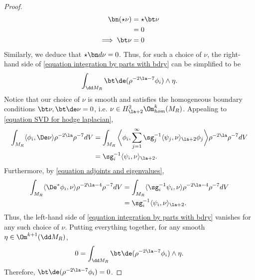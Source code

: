 \documentclass[hidelinks, 12pt, oneside, reqno]{amsart}
\begin{document}
\begin{proof}
\begin{align*}
        \bn(\star \nu) &= \star \bt \nu \\
        &= 0\\
        \implies \bt \nu & = 0
    \end{align*}
    Similarly, we deduce that $\star \bn d \nu = 0$. Thus, for such a choice of $\nu$, the right-hand side of \eqref{equation integration by parts with bdry} can be simplified to be
    \[
    \int_{\dd M_R} \bt \de (\rho^{-2\la- 7} \phi_i) \wedge \eta. 
    \]
    Notice that our choice of $\nu$ is smooth and satisfies the homogeneous boundary conditions $\bt \nu, \bt \de \nu = 0$, i.e. $\nu \in H^2_{\la+2}\Om^k_{hom}(M_R)$. Appealing to \eqref{equation SVD for hodge laplacian}, 
    \begin{align*}
    \int_{M_R} \langle \phi_i, \De \nu \rangle \rho^{-2\la} \rho^{-7} dV &= \int_{M_R} \bigg\langle \phi_i, \sum_{j=1}^\infty \sg_j^{-1} \langle \psi_j, \nu \rangle_{\la + 2} \phi_j \bigg\rangle \rho^{-2\la} \rho^{-7} dV  \\
    &=\sg_i^{-1} \langle \psi_i, \nu \rangle_{\la + 2}.
    \end{align*}
    Furthermore, by \eqref{equation adjoints and eigenvalues}, 
    \begin{align*}
        \int_{M_R} \langle \De^* \phi_i, \nu \rangle \rho^{-2\la-4}\rho^{-7} dV  &= \int_{M_R} \langle \sg_i^{-1} \psi_i, \nu \rangle \rho^{-2\la-4}\rho^{-7} dV \\
        &=\sg_i^{-1} \langle \psi_i, \nu \rangle_{\la + 2}. 
    \end{align*}
    Thus, the left-hand side of \eqref{equation integration by parts with bdry} vanishes for any such choice of $\nu$.  Putting everything together, for any smooth $\eta \in \Om^{k+1}(\dd M_R)$, 
    \[
    0 = \int_{\dd M_R} \bt \de (\rho^{-2\la- 7} \phi_i) \wedge \eta. 
    \]
    Therefore, $\bt \de (\rho^{-2\la- 7} \phi_i) = 0$.


\end{proof}
\end{document}
